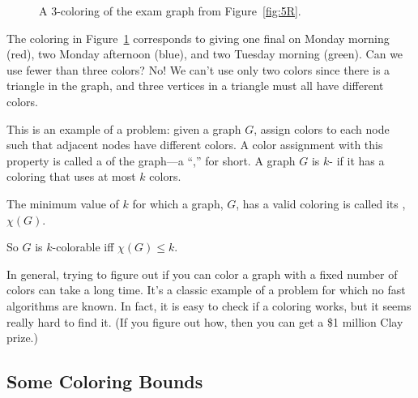 \begin{figure}


\caption{A 3-coloring of the exam graph from Figure~\ref{fig:5R}.}

\label{fig:5S}

\end{figure}

The coloring in Figure~\ref{fig:5S} corresponds to giving one final on
Monday morning (red), two Monday afternoon (blue), and two Tuesday
morning (green).  Can we use fewer than three colors?  No! We can't
use only two colors since there is a triangle in the graph, and three
vertices in a triangle must all have different colors.

This is an example of a  problem:
 given a graph $G$, assign colors to each
node such that adjacent nodes have different colors.  A color assignment
with this property is called a   of the graph---a ``,'' for short.  A graph $G$
is $k$- if it has a coloring that uses at most $k$ colors.
\begin{definition}
  The minimum value of $k$ for which a graph, $G$, has a valid coloring is
  called its , $\chi(G)$.
\end{definition}
\begin{editingnotes}
\end{editingnotes}
So $G$ is $k$-colorable iff $\chi(G) \leq k$.

In general, trying to figure out if you can color a graph with a fixed
number of colors can take a long time.  It's a classic example of a
problem for which no fast algorithms are known.  In fact, it is easy to
check if a coloring works, but it seems really hard to find it. (If you
figure out how, then you can get a \$1 million Clay prize.)


\subsection{Some Coloring Bounds}

